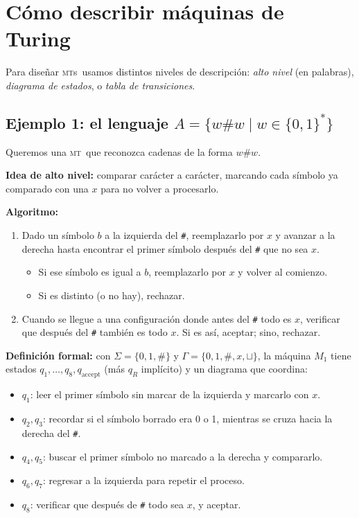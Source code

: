 \documentclass[11pt,a4paper]{article}
\theoremstyle{definicion}
\newcommand{\MT}{\textsc{mt}}
\newcommand{\MTs}{\textsc{mt}s}
\newcommand{\bl}{\sqcup}
\begin{document}
\section{Cómo describir máquinas de Turing}

Para diseñar \MTs\ usamos distintos niveles de descripción: \emph{alto nivel} (en palabras), \emph{diagrama de estados}, o \emph{tabla de transiciones}.

\subsection{Ejemplo 1: el lenguaje $A = \{w \# w \mid w \in \{0,1\}^*\}$}

Queremos una \MT\ que reconozca cadenas de la forma $w \# w$.

\textbf{Idea de alto nivel:} comparar carácter a carácter, marcando cada símbolo ya comparado con una $x$ para no volver a procesarlo.

\textbf{Algoritmo:}
\begin{enumerate}
    \item Dado un símbolo $b$ a la izquierda del \texttt{\#}, reemplazarlo por $x$ y avanzar a la derecha hasta encontrar el primer símbolo después del \texttt{\#} que no sea $x$.
    \begin{itemize}
        \item Si ese símbolo es igual a $b$, reemplazarlo por $x$ y volver al comienzo.
        \item Si es distinto (o no hay), rechazar.
    \end{itemize}
    \item Cuando se llegue a una configuración donde antes del \texttt{\#} todo es $x$, verificar que después del \texttt{\#} también es todo $x$. Si es así, aceptar; sino, rechazar.
\end{enumerate}

\textbf{Definición formal:} con $\Sigma = \{0, 1, \#\}$ y $\Gamma = \{0, 1, \#, x, \bl\}$, la máquina $M_1$ tiene estados $q_1, \dots, q_8, q_{\text{accept}}$ (más $q_R$ implícito) y un diagrama que coordina:
\begin{itemize}
    \item $q_1$: leer el primer símbolo sin marcar de la izquierda y marcarlo con $x$.
    \item $q_2, q_3$: recordar si el símbolo borrado era 0 o 1, mientras se cruza hacia la derecha del \texttt{\#}.
    \item $q_4, q_5$: buscar el primer símbolo no marcado a la derecha y compararlo.
    \item $q_6, q_7$: regresar a la izquierda para repetir el proceso.
    \item $q_8$: verificar que después de \texttt{\#} todo sea $x$, y aceptar.
\end{itemize}
\end{document}
